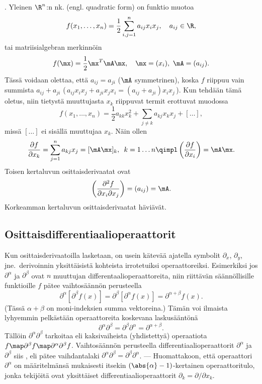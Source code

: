 \begin{Exa} . \label{neliömuoto} 
Yleinen $\R^n$:n nk.  (engl. quadratic form) on funktio muotoa
\[
f(x_1,\ldots,x_n)=\frac{1}{2}\sum_{i,j=1}^n a_{ij}x_ix_j,\quad a_{ij}\in\R,
\]
tai matriisialgebran merkinnöin
\[
f(\mx)=\frac{1}{2}\mx^T\mA\mx,\quad \mx=(x_i), \ \mA=(a_{ij}).
\]
Tässä voidaan olettaa, että $a_{ij}=a_{ji}$ ($\mA$ symmetrinen), koska $f$ riippuu vain 
summista $a_{ij}+a_{ji}$ (\,$a_{ij}x_ix_j+a_{ji}x_jx_i=(a_{ij}+a_{ji})x_ix_j$\,). Kun tehdään tämä
oletus, niin tietystä muuttujasta $x_k$ riippuvat termit erottuvat muodossa
\[
f(x_1,\ldots,x_n)=\frac{1}{2}a_{kk}x_k^2+\sum_{j\neq k} a_{kj} x_kx_j+ [\ldots],
\]
missä $[\ldots]$ ei sisällä muuttujaa $x_k$. Näin ollen
\[
\frac{\partial f}{\partial x_k}=\sum_{j=1}^n a_{kj} x_j = [\mA\mx]_k,\,\ k=1\ldots n
              \qimpl \left(\frac{\partial f}{\partial x_i}\right) = \mA\mx.
\]
Toisen kertaluvun osittaisderivaatat ovat
\[
\left(\frac{\partial^2 f}{\partial x_i\partial x_j}\right) = \left(a_{ij}\right) = \mA.
\]
Korkeamman kertaluvun osittaisderivaatat häviävät. \loppu
\end{Exa}

\subsection*{Osittaisdifferentiaalioperaattorit}

Kun osittaisderivaatoilla lasketaan, on usein kätevää ajatella symbolit $\partial_x$,
$\partial_y$, jne.\ derivoinnin yksittäisistä kohteista irrotetuiksi operaattoreiksi.
Esimerkiksi jos $\partial^\alpha$ ja $\partial^\beta$ ovat $n$ muuttujan
differentaalioperaattoreita, niin riittävän säännöllisille funktioille $f$ pätee vaihtosäännön
perusteella
\[
\partial^\alpha\left[\partial^\beta f(x)\right] = \partial^\beta\left[\partial^\alpha f(x)\right]
                                                = \partial^{\alpha+\beta} f(x).
\]
(Tässä $\alpha+\beta$ on moni-indeksien summa vektoreina.) Tämän voi ilmaista lyhyemmin
pelkästään operaattoreita koskevana laskusääntönä
\[
\partial^\alpha\partial^\beta=\partial^\beta\partial^\alpha=\partial^{\alpha+\beta}.
\]
Tällöin $\partial^\alpha\partial^\beta$ tarkoitaa  eli kaksivaiheista
(yhdistettyä) operaatiota $f \map \partial^\beta f \map \partial^\alpha\partial^\beta f$.
Vaihtosäännön perusteella differentiaalioperaattorit $\partial^\alpha$ ja $\partial^\beta$ siis
, eli pätee vaihdantalaki
$\partial^\alpha\partial^\beta=\partial^\beta\partial^\alpha$. --- Huomattakoon, että operaattori
$\partial^\alpha$ on määritelmänsä mukaisesti itsekin $(\abs{\alpha}-1)$-kertainen
operaattoritulo, jonka tekijöitä ovat yksittäiset differentiaalioperaattorit 
$\partial_k=\partial/\partial x_k$.

